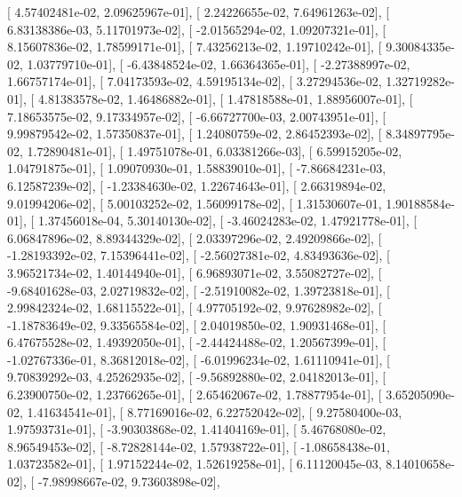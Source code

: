 \documentclass{article}
\begin{document}
       [  4.57402481e-02,   2.09625967e-01],
       [  2.24226655e-02,   7.64961263e-02],
       [  6.83138386e-03,   5.11701973e-02],
       [ -2.01565294e-02,   1.09207321e-01],
       [  8.15607836e-02,   1.78599171e-01],
       [  7.43256213e-02,   1.19710242e-01],
       [  9.30084335e-02,   1.03779710e-01],
       [ -6.43848524e-02,   1.66364365e-01],
       [ -2.27388997e-02,   1.66757174e-01],
       [  7.04173593e-02,   4.59195134e-02],
       [  3.27294536e-02,   1.32719282e-01],
       [  4.81383578e-02,   1.46486882e-01],
       [  1.47818588e-01,   1.88956007e-01],
       [  7.18653575e-02,   9.17334957e-02],
       [ -6.66727700e-03,   2.00743951e-01],
       [  9.99879542e-02,   1.57350837e-01],
       [  1.24080759e-02,   2.86452393e-02],
       [  8.34897795e-02,   1.72890481e-01],
       [  1.49751078e-01,   6.03381266e-03],
       [  6.59915205e-02,   1.04791875e-01],
       [  1.09070930e-01,   1.58839010e-01],
       [ -7.86684231e-03,   6.12587239e-02],
       [ -1.23384630e-02,   1.22674643e-01],
       [  2.66319894e-02,   9.01994206e-02],
       [  5.00103252e-02,   1.56099178e-02],
       [  1.31530607e-01,   1.90188584e-01],
       [  1.37456018e-04,   5.30140130e-02],
       [ -3.46024283e-02,   1.47921778e-01],
       [  6.06847896e-02,   8.89344329e-02],
       [  2.03397296e-02,   2.49209866e-02],
       [ -1.28193392e-02,   7.15396441e-02],
       [ -2.56027381e-02,   4.83493636e-02],
       [  3.96521734e-02,   1.40144940e-01],
       [  6.96893071e-02,   3.55082727e-02],
       [ -9.68401628e-03,   2.02719832e-02],
       [ -2.51910082e-02,   1.39723818e-01],
       [  2.99842324e-02,   1.68115522e-01],
       [  4.97705192e-02,   9.97628982e-02],
       [ -1.18783649e-02,   9.33565584e-02],
       [  2.04019850e-02,   1.90931468e-01],
       [  6.47675528e-02,   1.49392050e-01],
       [ -2.44424488e-02,   1.20567399e-01],
       [ -1.02767336e-01,   8.36812018e-02],
       [ -6.01996234e-02,   1.61110941e-01],
       [  9.70839292e-03,   4.25262935e-02],
       [ -9.56892880e-02,   2.04182013e-01],
       [  6.23900750e-02,   1.23766265e-01],
       [  2.65462067e-02,   1.78877954e-01],
       [  3.65205090e-02,   1.41634541e-01],
       [  8.77169016e-02,   6.22752042e-02],
       [  9.27580400e-03,   1.97593731e-01],
       [ -3.90303868e-02,   1.41404169e-01],
       [  5.46768080e-02,   8.96549453e-02],
       [ -8.72828144e-02,   1.57938722e-01],
       [ -1.08658438e-01,   1.03723582e-01],
       [  1.97152244e-02,   1.52619258e-01],
       [  6.11120045e-03,   8.14010658e-02],
       [ -7.98998667e-02,   9.73603898e-02],
\end{document}
